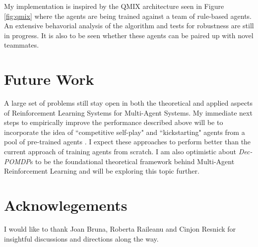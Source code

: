 \documentclass[12pt,a4paper]{article}
\begin{document}
My implementation is inspired by the QMIX architecture seen in Figure \ref{fig:qmix} where the
agents are being trained against a team of rule-based agents. An extensive behavorial analysis of 
the algorithm and tests for robustness are still in progress. It is also to be seen whether these 
agents can be paired up with novel teammates.

\section{Future Work} \label{section:future}

A large set of problems still stay open in both the theoretical and applied aspects of
Reinforcement Learning Systems for Multi-Agent Systems. My immediate next steps
to empirically improve the performance described above will be to incorporate the idea
of ``competitive self-play" \cite{2017arXiv171003748B} and ``kickstarting" agents from a
pool of pre-trained agents \cite{2018arXiv180303835S}. I expect these approaches to perform
better than the current approach of training agents from scratch. I am also optimistic about
\textit{Dec-POMDP}s to be the foundational theoretical framework behind Multi-Agent
Reinforcement Learning and will be exploring this topic further.

\section*{Acknowlegements} \label{section:ack}

I would like to thank Joan Bruna, Roberta Raileanu and Cinjon Resnick for insightful discussions
and directions along the way.


\end{document}
